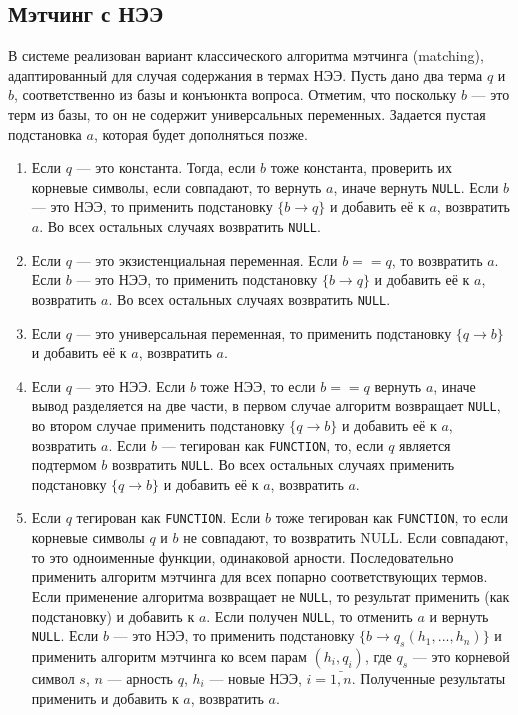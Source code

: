 \subsection{Мэтчинг с НЭЭ}

В системе реализован вариант классического алгоритма мэтчинга (mat\-ching), адаптированный для случая содержания в термах НЭЭ. Пусть дано два терма $q$ и $b$, соответственно из базы и конъюнкта вопроса. Отметим, что поскольку $b$ --- это терм из базы, то он не содержит универсальных переменных. Задается пустая подстановка $a$, которая будет дополняться позже.
\begin{enumerate}
\item Если $q$ --- это константа. Тогда, если $b$ тоже константа, проверить их корневые символы, если совпадают, то вернуть $a$, иначе вернуть \texttt{NULL}. Если $b$ --- это НЭЭ, то применить подстановку $\{b \rightarrow q\}$ и добавить её к $a$, возвратить $a$. Во всех остальных случаях возвратить \texttt{NULL}.

\item Если $q$ --- это экзистенциальная переменная. Если $b==q$, то возвратить $a$. Если $b$ --- это НЭЭ, то применить подстановку $\{b \rightarrow q\}$ и добавить её к $a$, возвратить $a$. Во всех остальных случаях возвратить \texttt{NULL}.

\item Если $q$ --- это универсальная переменная, то применить подстановку $\{q \rightarrow b\}$ и добавить её к $a$, возвратить $a$.

\item Если $q$ --- это НЭЭ. Если $b$ тоже НЭЭ, то если $b==q$ вернуть $a$, иначе вывод разделяется на две части, в первом случае алгоритм возвращает \texttt{NULL}, во втором случае применить подстановку $\{q \rightarrow b\}$ и добавить её к $a$, возвратить $a$. Если $b$ --- тегирован как \texttt{FUNCTION}, то, если $q$ является подтермом $b$ возвратить \texttt{NULL}. Во всех остальных случаях применить подстановку $\{q \rightarrow b\}$ и добавить её к $a$, возвратить $a$.

\item Если $q$ тегирован как \texttt{FUNCTION}. Если $b$ тоже тегирован как \texttt{FUNCTION}, то если корневые символы $q$ и $b$ не совпадают, то возвратить NULL. Если совпадают, то это одноименные функции, одинаковой арности. Последовательно применить алгоритм мэтчинга для всех попарно соответствующих термов. Если применение алгоритма возвращает не \texttt{NULL}, то результат применить (как подстановку) и добавить к $a$. Если получен \texttt{NULL}, то отменить $a$ и вернуть \texttt{NULL}. Если $b$ --- это НЭЭ, то применить подстановку $\{b \rightarrow q_s(h_1,...,h_n)\}$ и применить алгоритм мэтчинга ко всем парам $(h_i, q_i)$, где $q_s$ --- это корневой символ $s$, $n$ --- арность $q$, $h_i$ --- новые НЭЭ, $i = \bar{1,n}$. Полученные результаты применить и добавить к  $a$, возвратить $a$.
\end{enumerate}





